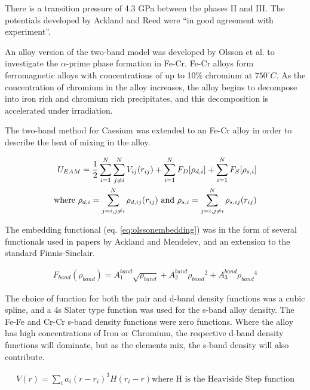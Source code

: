There is a transition pressure of 4.3 GPa between the phases II and III.  The potentials developed by Ackland and Reed were \enquote{in good agreement with experiment}\cite{twobandackland}.

An alloy version of the two-band model was developed by Olsson et al. to investigate the $\alpha$-prime phase formation in Fe-Cr\cite{olssonfecr}. Fe-Cr alloys form ferromagnetic alloys with concentrations of up to 10\% chromium at $750^{\circ}C$.  As the concentration of chromium in the alloy increases, the alloy begins to decompose into iron rich and chromium rich precipitates, and this decomposition is accelerated under irradiation.

The two-band method for Caesium was extended to an Fe-Cr alloy in order to describe the heat of mixing in the alloy.

\begin{equation}
\begin{split}
U_{EAM} = \frac{1}{2} \sum \limits_{i=1}^{N} \sum \limits_{j\ne i}^{N} V_{ij}(r_{ij}) + \sum \limits_{i=1}^{N} F_{D}[\rho _{d,i}] + \sum \limits_{i=1}^{N} F_{S}[\rho _{s,i}] \\
\textnormal{where   } \rho_{d,i} = \sum \limits_{j=i,j \ne i}^{N} \rho_{d,ij}(r_{ij})
\textnormal{  and  } \rho_{s,i} = \sum \limits_{j=i,j \ne i}^{N} \rho_{s,ij}(r_{ij})
\end{split}
\end{equation}

The embedding functional (eq. \ref{eq:olssonembedding}) was in the form of several functionals used in papers by Ackland and Mendelev, and an extension to the standard Finnis-Sinclair.

\begin{equation}
\begin{split}
F_{band} (\rho_{band}) = A^{band}_1 \sqrt{\rho_{band}} + A^{band}_2 {\rho_{band}}^2 +  A^{band}_3 {\rho_{band}}^4 
\end{split}
\label{eq:olssonembedding}
\end{equation}

The choice of function for both the pair and d-band density functions was a cubic spline, and a 4s Slater type function was used for the s-band alloy density.  The Fe-Fe and Cr-Cr s-band density functions were zero functions.  Where the alloy has high concentrations of Iron or Chromium, the respective d-band density functions will dominate, but as the elements mix, the s-band density will also contribute.

\begin{equation}
\begin{split}
V(r) = \sum_i a_i (r-r_i)^3 H(r_i - r) \text{where H is the Heaviside Step function}
\end{split}
\label{eq:olssonembedding}
\end{equation}

